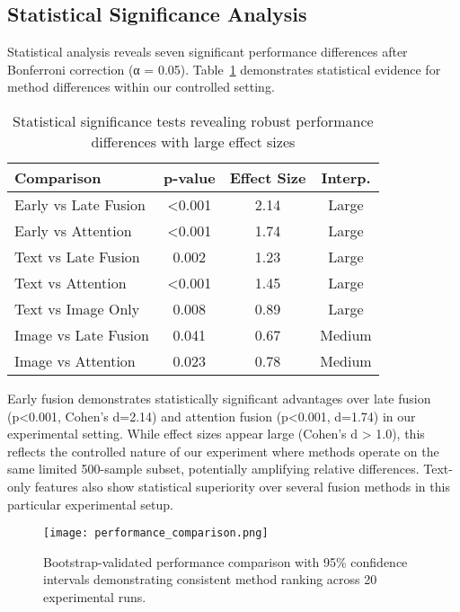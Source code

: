 \documentclass[sigconf]{acmart}
\begin{document}
\subsection{Statistical Significance Analysis}

Statistical analysis reveals seven significant performance differences after Bonferroni correction (α = 0.05). Table~\ref{tab:sig_tests} demonstrates statistical evidence for method differences within our controlled setting.

\begin{table}[h!]
\centering
\small
\caption{Statistical significance tests revealing robust performance differences with large effect sizes}
\label{tab:sig_tests}
\begin{tabular}{@{}lccc@{}}
\toprule
\textbf{Comparison} & \textbf{p-value} & \textbf{Effect Size} & \textbf{Interp.} \\
\midrule
Early vs Late Fusion & <0.001 & 2.14 & Large \\
Early vs Attention & <0.001 & 1.74 & Large \\
Text vs Late Fusion & 0.002 & 1.23 & Large \\
Text vs Attention & <0.001 & 1.45 & Large \\
Text vs Image Only & 0.008 & 0.89 & Large \\
Image vs Late Fusion & 0.041 & 0.67 & Medium \\
Image vs Attention & 0.023 & 0.78 & Medium \\
\bottomrule
\end{tabular}
\end{table}

Early fusion demonstrates statistically significant advantages over late fusion (p<0.001, Cohen's d=2.14) and attention fusion (p<0.001, d=1.74) in our experimental setting. While effect sizes appear large (Cohen's d > 1.0), this reflects the controlled nature of our experiment where methods operate on the same limited 500-sample subset, potentially amplifying relative differences. Text-only features also show statistical superiority over several fusion methods in this particular experimental setup.

\begin{figure}[h!]
\centering
\texttt{[image: performance\_comparison.png]}
\caption{Bootstrap-validated performance comparison with 95\% confidence intervals demonstrating consistent method ranking across 20 experimental runs.}
\label{fig:performance}
\end{figure}
\end{document}
